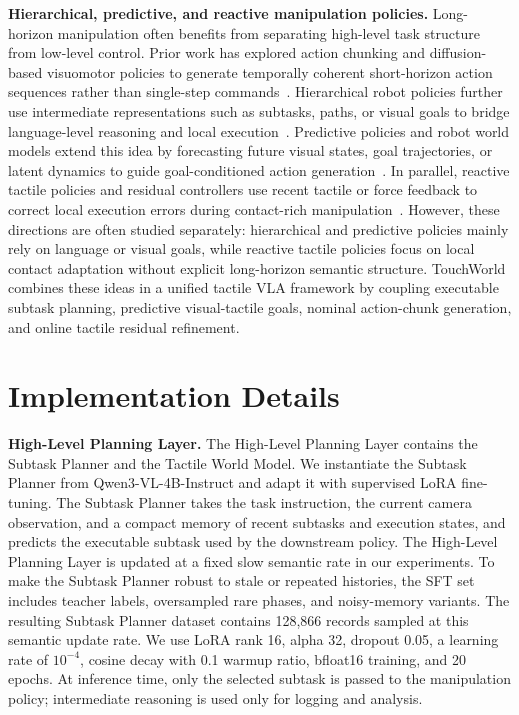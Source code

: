 \noindent\textbf{Hierarchical, predictive, and reactive manipulation policies.}
Long-horizon manipulation often benefits from separating high-level task structure from low-level control.
Prior work has explored action chunking and diffusion-based visuomotor policies to generate temporally coherent short-horizon action sequences rather than single-step commands~\cite{zhao2023learningfinegrainedbimanualmanipulation,chi2025diffusion,black2025realtimeexecutionactionchunking}.
Hierarchical robot policies further use intermediate representations such as subtasks, paths, or visual goals to bridge language-level reasoning and local execution~\cite{li2025hamsterhierarchicalactionmodels}.
Predictive policies and robot world models extend this idea by forecasting future visual states, goal trajectories, or latent dynamics to guide goal-conditioned action generation~\cite{zhou2025act2goalworldmodelgeneral,zang2026tacforesightforceguidedtactileworld}.
In parallel, reactive tactile policies and residual controllers use recent tactile or force feedback to correct local execution errors during contact-rich manipulation~\cite{xue2025reactivediffusionpolicyslowfast,zhao2025touchbeginsvisionends}.
However, these directions are often studied separately: hierarchical and predictive policies mainly rely on language or visual goals, while reactive tactile policies focus on local contact adaptation without explicit long-horizon semantic structure.
TouchWorld combines these ideas in a unified tactile VLA framework by coupling executable subtask planning, predictive visual-tactile goals, nominal action-chunk generation, and online tactile residual refinement.


\section{Implementation Details}

\noindent\textbf{High-Level Planning Layer.}
The High-Level Planning Layer contains the Subtask Planner and the Tactile World Model.
We instantiate the Subtask Planner from Qwen3-VL-4B-Instruct and adapt it with supervised LoRA fine-tuning.
The Subtask Planner takes the task instruction, the current camera observation, and a compact memory of recent subtasks and execution states, and predicts the executable subtask used by the downstream policy.
The High-Level Planning Layer is updated at a fixed slow semantic rate in our experiments.
To make the Subtask Planner robust to stale or repeated histories, the SFT set includes teacher labels, oversampled rare phases, and noisy-memory variants.
The resulting Subtask Planner dataset contains 128,866 records sampled at this semantic update rate.
We use LoRA rank 16, alpha 32, dropout 0.05, a learning rate of $10^{-4}$, cosine decay with 0.1 warmup ratio, bfloat16 training, and 20 epochs.
At inference time, only the selected subtask is passed to the manipulation policy; intermediate reasoning is used only for logging and analysis.

